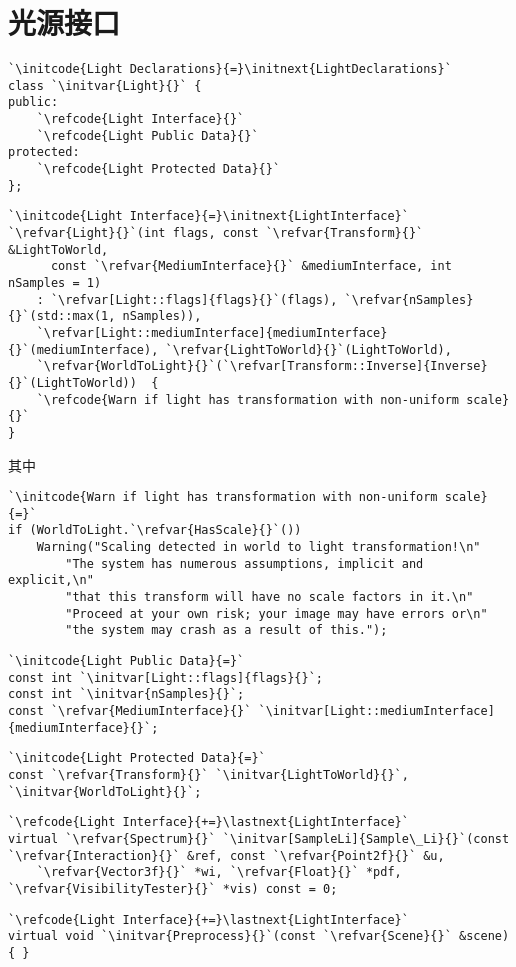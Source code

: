 \section{光源接口}\label{sec:光源接口}

\begin{lstlisting}
`\initcode{Light Declarations}{=}\initnext{LightDeclarations}`
class `\initvar{Light}{}` {
public:
    `\refcode{Light Interface}{}`
    `\refcode{Light Public Data}{}`
protected:
    `\refcode{Light Protected Data}{}`
};
\end{lstlisting}

\begin{lstlisting}
`\initcode{Light Interface}{=}\initnext{LightInterface}`
`\refvar{Light}{}`(int flags, const `\refvar{Transform}{}` &LightToWorld,
      const `\refvar{MediumInterface}{}` &mediumInterface, int nSamples = 1)
    : `\refvar[Light::flags]{flags}{}`(flags), `\refvar{nSamples}{}`(std::max(1, nSamples)),
    `\refvar[Light::mediumInterface]{mediumInterface}{}`(mediumInterface), `\refvar{LightToWorld}{}`(LightToWorld),
    `\refvar{WorldToLight}{}`(`\refvar[Transform::Inverse]{Inverse}{}`(LightToWorld))  { 
    `\refcode{Warn if light has transformation with non-uniform scale}{}`
}
\end{lstlisting}
其中
\begin{lstlisting}
`\initcode{Warn if light has transformation with non-uniform scale}{=}`
if (WorldToLight.`\refvar{HasScale}{}`())
    Warning("Scaling detected in world to light transformation!\n"
        "The system has numerous assumptions, implicit and explicit,\n"
        "that this transform will have no scale factors in it.\n"
        "Proceed at your own risk; your image may have errors or\n"
        "the system may crash as a result of this.");
\end{lstlisting}
\begin{lstlisting}
`\initcode{Light Public Data}{=}`
const int `\initvar[Light::flags]{flags}{}`;
const int `\initvar{nSamples}{}`;
const `\refvar{MediumInterface}{}` `\initvar[Light::mediumInterface]{mediumInterface}{}`;
\end{lstlisting}

\begin{lstlisting}
`\initcode{Light Protected Data}{=}`
const `\refvar{Transform}{}` `\initvar{LightToWorld}{}`, `\initvar{WorldToLight}{}`;
\end{lstlisting}
\begin{lstlisting}
`\refcode{Light Interface}{+=}\lastnext{LightInterface}`
virtual `\refvar{Spectrum}{}` `\initvar[SampleLi]{Sample\_Li}{}`(const `\refvar{Interaction}{}` &ref, const `\refvar{Point2f}{}` &u,
    `\refvar{Vector3f}{}` *wi, `\refvar{Float}{}` *pdf, `\refvar{VisibilityTester}{}` *vis) const = 0;
\end{lstlisting}
\begin{lstlisting}
`\refcode{Light Interface}{+=}\lastnext{LightInterface}`
virtual void `\initvar{Preprocess}{}`(const `\refvar{Scene}{}` &scene) { }
\end{lstlisting}


